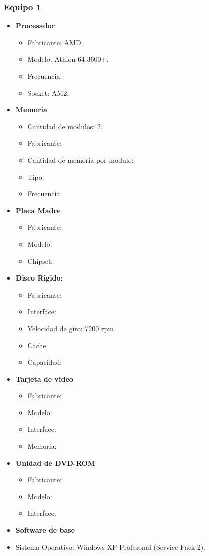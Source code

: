 \subsubsection{Equipo 1}
\begin{itemize}
\item \textbf{Procesador}
	\begin{itemize}
	\item Fabricante: AMD.	
	\item Modelo: Athlon 64 3600+.
	\item Frecuencia:
	\item Socket: AM2.
	\end{itemize}
\item \textbf{Memoria}
	\begin{itemize}
	\item Cantidad de modulos: 2.
	\item Fabricante:
	\item Cantidad de memoria por modulo:
	\item Tipo:
	\item Frecuencia:
	\end{itemize}
\item \textbf{Placa Madre}
	\begin{itemize}
	\item Fabricante:
	\item Modelo:
	\item Chipset:
	\end{itemize}
\item \textbf{Disco Rigido}:
	\begin{itemize}
	\item Fabricante:
	\item Interface:
	\item Velocidad de giro: 7200 rpm.
	\item Cache:
	\item Capacidad:
	\end{itemize}
\item \textbf{Tarjeta de video}
	\begin{itemize}
	\item Fabricante:
	\item Modelo:
	\item Interface:
	\item Memoria:
	\end{itemize}
\item \textbf{Unidad de DVD-ROM}
	\begin{itemize}
	\item Fabricante:
	\item Modelo:
	\item Interface:
	\end{itemize}
\item \textbf{Software de base}
	\item Sistema Operativo: Windows XP Profesonal (Service Pack 2).
\end{itemize} 
 

